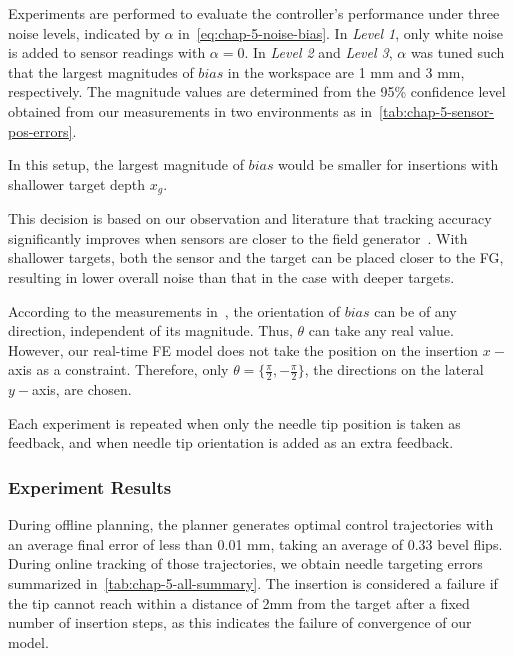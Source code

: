 Experiments are performed to evaluate the controller's performance under three noise levels, indicated by $\alpha$ in~\cref{eq:chap-5-noise-bias}. In \textit{Level 1}, only white noise is added to sensor readings with $\alpha = 0$. In \textit{Level 2} and \textit{Level 3}, $\alpha$ was tuned such that the largest magnitudes of $bias$ in the workspace are 1 mm and 3 mm, respectively. The magnitude values are determined from the 95\% confidence level obtained from our measurements in two environments as in~\cref{tab:chap-5-sensor-pos-errors}.

In this setup, the largest magnitude of $bias$ would be smaller for insertions with shallower target depth $x_g$.

This decision is based on our observation and literature that tracking accuracy significantly improves when sensors are closer to the field generator~\parencite{nakamotoMagnetoOpticHybrid3D2000}. With shallower targets, both the sensor and the target can be placed closer to the FG, resulting in lower overall noise than that in the case with deeper targets.

According to the measurements in~\parencite{sadjadiSimultaneousElectromagneticTracking2016}, the orientation of $bias$ can be of any direction, independent of its magnitude. Thus, $\theta$ can take any real value. However, our real-time FE model does not take the position on the insertion $x-$axis as a constraint. Therefore, only $\theta = \{\frac{\pi}{2},-\frac{\pi}{2}\}$, the directions on the lateral $y-$axis, are chosen.

Each experiment is repeated when only the needle tip position is taken as feedback, and when needle tip orientation is added as an extra feedback.

\subsubsection{Experiment Results}
\label{sec:chap-5-sim-exp-results}

During offline planning, the planner generates optimal control trajectories with an average final error of less than 0.01 mm, taking an average of $0.33$ bevel flips. During online tracking of those trajectories, we obtain needle targeting errors summarized in~\cref{tab:chap-5-all-summary}. The insertion is considered a failure if the tip cannot reach within a distance of 2mm from the target after a fixed number of insertion steps, as this indicates the failure of convergence of our model.

